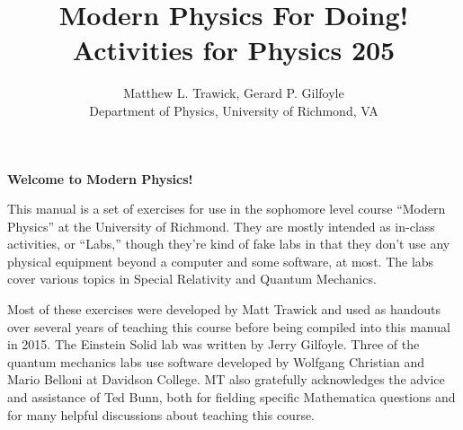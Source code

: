 

\title{Modern Physics For Doing!\\
Activities for Physics 205}

\author{Matthew L. Trawick, Gerard P. Gilfoyle\\[4pt]
Department of Physics, University of Richmond, VA \\[4pt]
}

\maketitle

\vspace{0.8 in}


\begin{center}
\large{\textbf{Welcome to Modern Physics!}}
\end{center}


This manual is a set of exercises for use in the sophomore level course ``Modern Physics'' at the University of Richmond.  They are mostly intended as in-class activities, or ``Labs,'' though they’re kind of fake labs in that they don't use any physical equipment beyond a computer and some software, at most.  The labs cover various topics in Special Relativity and Quantum Mechanics.

Most of these exercises were developed by Matt Trawick and used as handouts over several years of teaching this course before being compiled into this manual in 2015.  The Einstein Solid lab was written by Jerry Gilfoyle.  Three of the quantum mechanics labs use software developed by Wolfgang Christian and Mario Belloni at Davidson College.  MT also gratefully acknowledges the advice and assistance of Ted Bunn, both for fielding specific Mathematica questions and for many helpful discussions about teaching this course.



\newpage
\
\thispagestyle{plain}

\newpage
\
